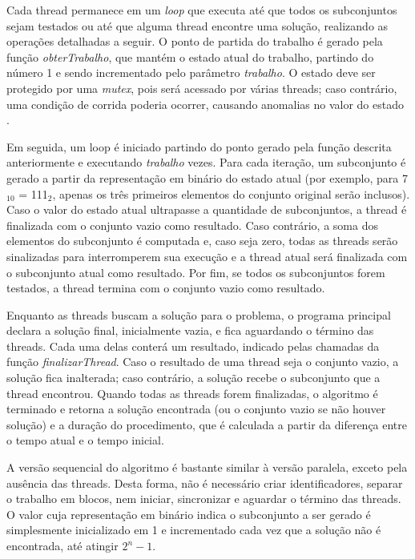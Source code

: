 \documentclass[12pt]{article}
\begin{document}
Cada thread permanece em um \textit{loop} que executa até que todos os subconjuntos sejam testados ou até que alguma thread encontre uma solução, realizando as operações detalhadas a seguir. O ponto de partida do trabalho é gerado pela função \textit{obterTrabalho}, que mantém o estado atual do trabalho, partindo do número 1 e sendo incrementado pelo parâmetro \textit{trabalho}. O estado deve ser protegido por uma \textit{mutex}, pois será acessado por várias threads; caso contrário, uma condição de corrida poderia ocorrer, causando anomalias no valor do estado \cite{Lewis1996}.

Em seguida, um loop é iniciado partindo do ponto gerado pela função descrita anteriormente e executando \textit{trabalho} vezes. Para cada iteração, um subconjunto é gerado a partir da representação em binário do estado atual (por exemplo, para 7$_{10}$ = 111$_{2}$, apenas os três primeiros elementos do conjunto original serão inclusos). Caso o valor do estado atual ultrapasse a quantidade de subconjuntos, a thread é finalizada com o conjunto vazio como resultado. Caso contrário, a soma dos elementos do subconjunto é computada e, caso seja zero, todas as threads serão sinalizadas para interromperem sua execução e a thread atual será finalizada com o subconjunto atual como resultado. Por fim, se todos os subconjuntos forem testados, a thread termina com o conjunto vazio como resultado.

Enquanto as threads buscam a solução para o problema, o programa principal declara a solução final, inicialmente vazia, e fica aguardando o término das threads. Cada uma delas conterá um resultado, indicado pelas chamadas da função \textit{finalizarThread}. Caso o resultado de uma thread seja o conjunto vazio, a solução fica inalterada; caso contrário, a solução recebe o subconjunto que a thread encontrou. Quando todas as threads forem finalizadas, o algoritmo é terminado e retorna a solução encontrada (ou o conjunto vazio se não houver solução) e a duração do procedimento, que é calculada a partir da diferença entre o tempo atual e o tempo inicial.

A versão sequencial do algoritmo é bastante similar à versão paralela, exceto pela ausência das threads. Desta forma, não é necessário criar identificadores, separar o trabalho em blocos, nem iniciar, sincronizar e aguardar o término das threads. O valor cuja representação em binário indica o subconjunto a ser gerado é simplesmente inicializado em 1 e incrementado cada vez que a solução não é encontrada, até atingir $2^{n} - 1$.
\end{document}
